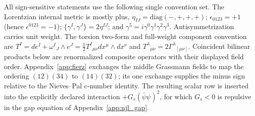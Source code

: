 \documentclass[aps,prd,twocolumn,superscriptaddress,preprintnumbers,nofootinbib,longbibliography,floatfix]{revtex4-2}
\begin{document}
All sign-sensitive statements use the following single convention set.
The Lorentzian internal metric is mostly plus,
$\eta_{IJ}=\mathrm{diag}(-,+,+,+)$; $\epsilon_{0123}=+1$ (hence
$\epsilon^{0123}=-1$); $\{\gamma^I,\gamma^J\}=2\eta^{IJ}$; and
$\gamma^5=i\gamma^0\gamma^1\gamma^2\gamma^3$.  Antisymmetrization carries
unit weight.  The torsion two-form and full-weight component convention are
$T^I=de^I+\omega^I{}_J\wedge e^J
=\tfrac12T^I{}_{\mu\nu}dx^\mu\wedge dx^\nu$ and
$T^\lambda{}_{\mu\nu}=2\Gamma^\lambda{}_{[\mu\nu]}$.  Coincident bilinear
products below are renormalized composite operators with their displayed
field order.  Appendix~\ref{app:fierz} exchanges the middle Grassmann fields
to map the ordering $(12)(34)$ to $(14)(32)$; its one exchange supplies the
minus sign relative to the Nieves--Pal c-number identity.  The resulting
scalar row is inserted into the explicitly declared interaction
$+G_s(\bar\psi\psi)^2$, for which $G_s<0$ is repulsive in the gap equation of
Appendix~\ref{app:njl_gap}.
\end{document}
